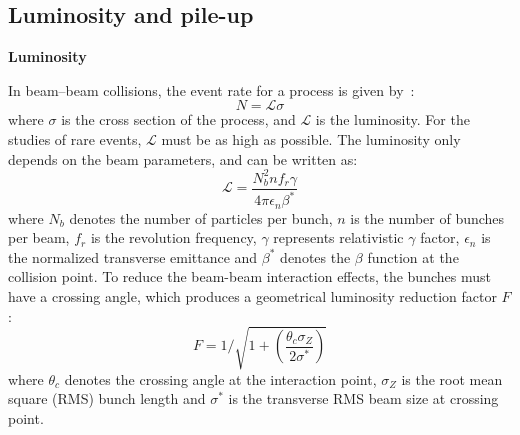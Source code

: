\subsection{Luminosity and pile-up}

\textbf{Luminosity}

In beam–beam collisions, the event rate for a process is given by~\cite{Evans_2008}:
\begin{equation}
	N = \mathcal{L} \sigma
\end{equation}
where $\sigma$ is the cross section of the process, and $\mathcal{L}$ is the luminosity.
For the studies of rare events, $\mathcal{L}$ must be as high as possible.
The luminosity only depends on the beam parameters, and can be written as:
\begin{equation} \label{eq:lumi}
	\mathcal{L} = \frac{ N_{b}^{2} n f_{r} \gamma}{4\pi \epsilon_{n} \beta^{*}}
\end{equation}
where $N_{b}$ denotes the number of particles per bunch, $n$ is the number of bunches per beam,
$f_{r}$ is the revolution frequency, $\gamma$ represents relativistic $\gamma$ factor, 
$\epsilon_{n}$ is the normalized transverse emittance and $\beta^{*}$ denotes the $\beta$ function at the collision point.
To reduce the beam-beam interaction effects, the bunches must have a crossing angle,
which produces a geometrical luminosity reduction factor $F$:
\begin{equation}
	F = 1 / \sqrt{1 + \left( \frac{\theta_{c}\sigma_{Z}}{2\sigma^{*}} \right) }
\end{equation}
where $\theta_{c}$ denotes the crossing angle at the interaction point, $\sigma_{Z}$ is the root mean square (RMS) bunch length
and $\sigma^{*}$ is the transverse RMS beam size at crossing point.

